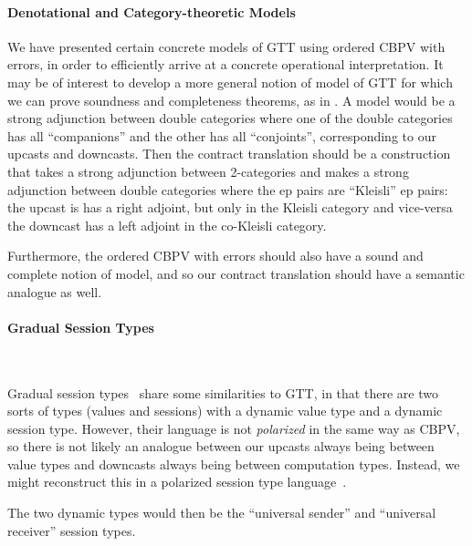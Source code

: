 \documentclass[acmsmall,screen,12pt]{acmart}
\renewcommand{\u}{\underline}
\begin{document}
{%


\begin{longonly}
\paragraph{Denotational and Category-theoretic Models}

We have presented certain concrete models of GTT using ordered CBPV
with errors, in order to efficiently arrive at a concrete operational
interpretation.
%
It may be of interest to develop a more general notion of model of GTT
for which we can prove soundness and completeness theorems, as in
\citet{newlicata2018-fscd}.
%
A model would be a strong adjunction between double categories where
one of the double categories has all ``companions'' and the other has
all ``conjoints'', corresponding to our upcasts and downcasts.
%
Then the contract translation should be a construction that takes a
strong adjunction between 2-categories and makes a strong adjunction
between double categories where the ep pairs are ``Kleisli'' ep pairs:
the upcast is has a right adjoint, but only in the Kleisli category and
vice-versa the downcast has a left adjoint in the co-Kleisli category.

Furthermore, the ordered CBPV with errors should also have a sound and
complete notion of model, and so our contract translation should have
a semantic analogue as well.
\end{longonly}

\begin{longonly}
  \paragraph{Gradual Session Types} ~
\end{longonly}
Gradual session types~\cite{igarashi+17gradualsession} share some
similarities to GTT, in that there are two sorts of types (values and
sessions) with a dynamic value type and a dynamic session type.
However, their language is not \emph{polarized} in the same way as CBPV,
so there is not likely an analogue between our upcasts always being
between value types and downcasts always being between computation
types.  Instead, we might reconstruct this in a polarized session
type language~\cite{pfenninggriffith15session}.
\begin{longonly}
The two dynamic types would then be the ``universal sender'' and
``universal receiver'' session types.
\end{longonly}

}
\end{document}
